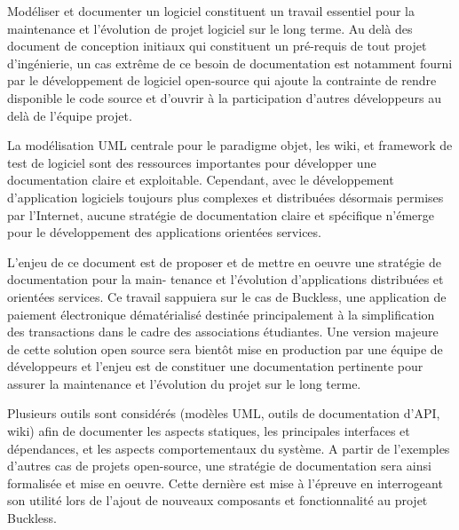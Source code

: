 Modéliser et documenter un logiciel constituent un travail essentiel pour la maintenance et l'évolution de projet
logiciel sur le long terme. Au delà des document de conception initiaux qui constituent un pré-requis de tout projet
d'ingénierie, un cas extrême de ce besoin de documentation est notamment fourni par le développement de logiciel
open-source qui ajoute la contrainte de rendre disponible le code source et d'ouvrir à la participation d'autres
développeurs au delà de l'équipe projet.

La modélisation UML centrale pour le paradigme objet, les wiki, et framework
de test de logiciel sont des ressources importantes pour développer une documentation claire et exploitable. Cependant,
avec le développement d'application logiciels toujours plus complexes et distribuées désormais permises par
l'Internet, aucune stratégie de documentation claire et spécifique n'émerge pour le développement des applications
orientées services.

L'enjeu de ce document est de proposer et de mettre en oeuvre une stratégie de documentation pour la main-
tenance et l'évolution d'applications distribuées et orientées services. Ce travail sappuiera sur le cas de Buckless,
une application de paiement électronique dématérialisé destinée principalement à la simplification des transactions
dans le cadre des associations étudiantes. Une version majeure de cette solution open source sera bientôt mise en
production par une équipe de développeurs et l'enjeu est de constituer une documentation pertinente pour assurer
la maintenance et l'évolution du projet sur le long terme.

Plusieurs outils sont considérés (modèles UML, outils de documentation d'API, wiki) afin de documenter les
aspects statiques, les principales interfaces et dépendances, et les aspects comportementaux du système. A partir
de l'exemples d'autres cas de projets open-source, une stratégie de documentation sera ainsi formalisée et mise en
oeuvre. Cette dernière est mise à l'épreuve en interrogeant son utilité lors de l'ajout de nouveaux composants et
fonctionnalité au projet Buckless.